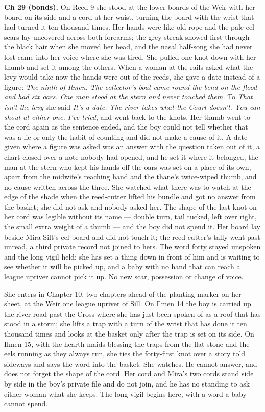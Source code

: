 \documentclass{design/chronicle}
\begin{document}
{\textbf{Ch 29 (bonds).} On Reed 9 she stood at the lower boards of the Weir with her board on its side and a cord at her waist, turning the board with the wrist that had turned it ten thousand times. Her hands were like old rope and the pale eel scars lay uncovered across both forearms; the grey streak showed first through the black hair when she moved her head, and the nasal half-song she had never lost came into her voice where she was tired. She pulled one knot down with her thumb and set it among the others. When a woman at the rails asked what the levy would take now the hands were out of the reeds, she gave a date instead of a figure: \emph{The ninth of Ilmen. The collector’s boat came round the bend on the flood and had six oars. One man stood at the stern and never touched them.} To \emph{That isn’t the levy} she said \emph{It’s a date. The river takes what the Court doesn’t. You can shout at either one. I’ve tried}, and went back to the knots. Her thumb went to the cord again as the sentence ended, and the boy could not tell whether that was a lie or only the habit of counting and did not make a cause of it. A date given where a figure was asked was an answer with the question taken out of it, a chart closed over a note nobody had opened, and he set it where it belonged; the man at the stern who kept his hands off the oars was set on a place of its own, apart from the midwife’s reaching hand and the thane’s twice-wiped thumb, and no cause written across the three. She watched what there was to watch at the edge of the shade when the reed-cutter lifted his bundle and got no answer from the basket; she did not ask and nobody asked her. The shape of the last knot on her cord was legible without its name — double turn, tail tucked, left over right, the small extra weight of a thumb — and the boy did not spend it. Her board lay beside Mira Silt’s eel board and did not touch it; the reed-cutter’s tally went past unread, a third private record not joined to hers. The word forty stayed unspoken and the long vigil held: she has set a thing down in front of him and is waiting to see whether it will be picked up, and a baby with no hand that can reach a league upriver cannot pick it up. No new scar, possession or change of voice.

She enters in Chapter 10, two chapters ahead of the planting marker on her sheet, at the Weir one league upriver of Sill. On Ilmen 14 the boy is carried up the river road past the Cross where she has just been spoken of as a roof that has stood in a storm; she lifts a trap with a turn of the wrist that has done it ten thousand times and looks at the basket only after the trap is set on its side. On Ilmen 15, with the hearth-maids blessing the traps from the flat stone and the eels running as they always run, she ties the forty-first knot over a story told sideways and says the word into the basket. She watches. He cannot answer, and does not forget the shape of the cord. Her cord and Mira’s two cords stand side by side in the boy’s private file and do not join, and he has no standing to ask either woman what she keeps. The long vigil begins here, with a word a baby cannot spend.

}
\end{document}
